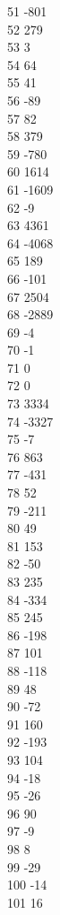 { 51	-801 \\
 52	279 \\
 53	3 \\
 54	64 \\
 55	41 \\
 56	-89 \\
 57	82 \\
 58	379 \\
 59	-780 \\
 60	1614 \\
 61	-1609 \\
 62	-9 \\
 63	4361 \\
 64	-4068 \\
 65	189 \\
 66	-101 \\
 67	2504 \\
 68	-2889 \\
 69	-4 \\
 70	-1 \\
 71	0 \\
 72	0 \\
 73	3334 \\
 74	-3327 \\
 75	-7 \\
 76	863 \\
 77	-431 \\
 78	52 \\
 79	-211 \\
 80	49 \\
 81	153 \\
 82	-50 \\
 83	235 \\
 84	-334 \\
 85	245 \\
 86	-198 \\
 87	101 \\
 88	-118 \\
 89	48 \\
 90	-72 \\
 91	160 \\
 92	-193 \\
 93	104 \\
 94	-18 \\
 95	-26 \\
 96	90 \\
 97	-9 \\
 98	8 \\
 99	-29 \\
 100	-14 \\
 101	16 \\
}
